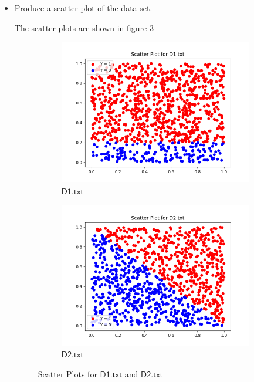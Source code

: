 \documentclass[a4paper]{article}
\theoremstyle{definition}
\newenvironment{soln}{
    \leavevmode\color{blue}\ignorespaces
}{}
\begin{document}
\begin{enumerate}
\begin{itemize}
  \item Produce a scatter plot of the data set.

  \begin{soln}
      The scatter plots are shown in figure \ref{fig:4}

      \begin{figure}[h]
          \centering
          \begin{subfigure}{0.5\textwidth}
          \centering
          \includegraphics[width=1.1\linewidth]{Scatter_D_1.png}
          \caption{$\mathsf{D1.txt}$}
          \label{fig:3sub1}
        \end{subfigure}%
        \begin{subfigure}{0.5\textwidth}
          \centering
          \includegraphics[width=1.1\linewidth]{Scatter_D_2.png}
          \caption{$\mathsf{D2.txt}$}
          \label{fig:3sub2}
          \end{subfigure}
          \caption{Scatter Plots for $\mathsf{D1.txt}$ and $\mathsf{D2.txt}$}
          \label{fig:4}
      \end{figure}
  \end{soln}


\end{itemize}
\end{enumerate}
\end{document}
